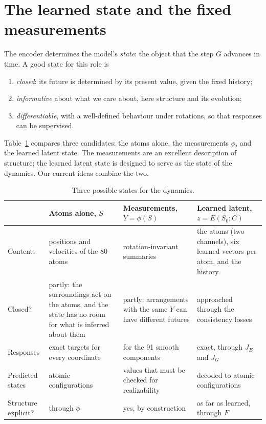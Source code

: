 \documentclass[11pt,a4paper]{article}
\numberwithin{equation}{section}
\begin{document}
\section{The learned state and the fixed measurements}
\label{sec:state}

The encoder determines the model's \emph{state}: the object that the step $G$
advances in time. A good state for this role is
\begin{enumerate}[label=(\roman*),leftmargin=2em]
\item \emph{closed}: its future is determined by its present value, given the fixed history;
\item \emph{informative} about what we care about, here structure and its evolution;
\item \emph{differentiable}, with a well-defined behaviour under rotations, so that responses
  can be supervised.
\end{enumerate}
Table~\ref{tab:states} compares three candidates: the atoms alone, the measurements
$\phi$, and the learned latent state. The measurements are an excellent
description of structure; the learned latent state is designed to serve as the
state of the dynamics. Our current ideas combine the two.

\begin{table}[ht]
\centering\small
\caption{Three possible states for the dynamics.}
\label{tab:states}
\renewcommand{\arraystretch}{1.12}
\begin{tabularx}{\linewidth}{@{}>{\raggedright\arraybackslash}p{2.35cm}
  >{\raggedright\arraybackslash}X >{\raggedright\arraybackslash}X >{\raggedright\arraybackslash}X@{}}
\toprule
 & Atoms alone, $S$ & Measurements, $Y=\phi(S)$ & Learned latent, $z=E(S_0;C)$\\
\midrule
Contents & positions and velocities of the 80 atoms & 244 rotation-invariant summaries
  & the atoms (two channels), six learned vectors per atom, and the history\\
Closed? & partly: the surroundings act on the atoms, and the state has no room for what is inferred about them
  & partly: arrangements with the same $Y$ can have different futures
  & approached through the consistency losses\\
Responses & exact targets for every coordinate & for the 91 smooth components
  & exact, through $J_E$ and $J_G$\\
Predicted states & atomic configurations & values that must be checked for realizability
  & decoded to atomic configurations\\
Structure explicit? & through $\phi$ & yes, by construction & as far as learned, through $F$\\
\bottomrule
\end{tabularx}
\end{table}
\end{document}
